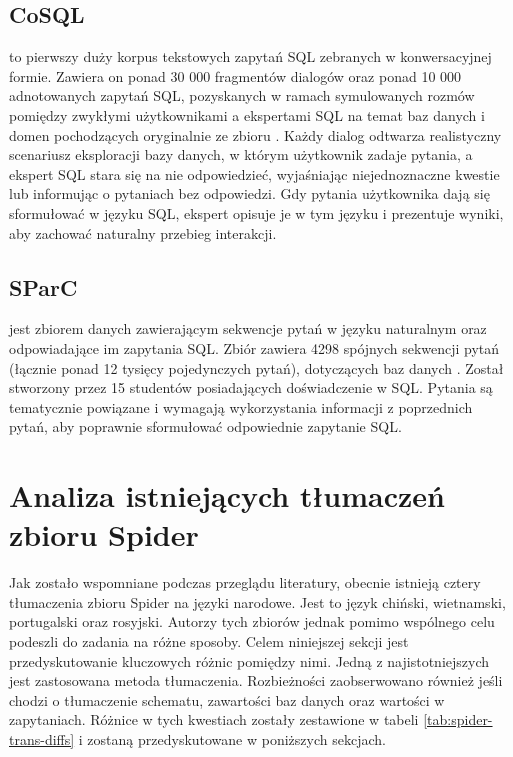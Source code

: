 \subsection{CoSQL}
 to pierwszy duży korpus tekstowych zapytań SQL zebranych w konwersacyjnej formie. Zawiera on ponad 30 000 fragmentów dialogów oraz ponad 10 000 adnotowanych zapytań SQL, pozyskanych w ramach symulowanych rozmów pomiędzy zwykłymi użytkownikami a ekspertami SQL na temat baz danych i domen pochodzących oryginalnie ze zbioru . Każdy dialog odtwarza realistyczny scenariusz eksploracji bazy danych, w którym użytkownik zadaje pytania, a ekspert SQL stara się na nie odpowiedzieć, wyjaśniając niejednoznaczne kwestie lub informując o pytaniach bez odpowiedzi. Gdy pytania użytkownika dają się sformułować w języku SQL, ekspert opisuje je w tym języku i prezentuje wyniki, aby zachować naturalny przebieg interakcji.

\subsection{SParC}
 jest zbiorem danych zawierającym sekwencje pytań w języku naturalnym oraz odpowiadające im zapytania SQL. Zbiór zawiera 4298 spójnych sekwencji pytań (łącznie ponad 12 tysięcy pojedynczych pytań), dotyczących baz danych . Został stworzony przez 15 studentów posiadających doświadczenie w SQL. Pytania są tematycznie powiązane i wymagają wykorzystania informacji z poprzednich pytań, aby poprawnie sformułować odpowiednie zapytanie SQL.

\section{Analiza istniejących tłumaczeń zbioru Spider}
Jak zostało wspomniane podczas przeglądu literatury, obecnie istnieją cztery tłumaczenia zbioru Spider na języki narodowe. Jest to język chiński, wietnamski, portugalski oraz rosyjski. Autorzy tych zbiorów jednak pomimo wspólnego celu podeszli do zadania na różne sposoby. Celem niniejszej sekcji jest przedyskutowanie kluczowych różnic pomiędzy nimi. Jedną z najistotniejszych jest zastosowana metoda tłumaczenia. Rozbieżności zaobserwowano również jeśli chodzi o tłumaczenie schematu, zawartości baz danych oraz wartości w zapytaniach. Różnice w tych kwestiach zostały zestawione w tabeli \ref{tab:spider-trans-diffs} i zostaną przedyskutowane w poniższych sekcjach.


